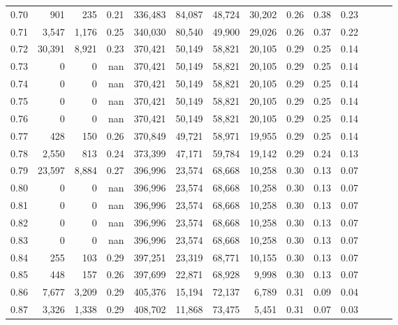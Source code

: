 \begin{tabular}{rrrrrrrrrrrrrr}
0.70 &     901 &    235 &  0.21 &  336,483 &   84,087 &  48,724 &  30,202 &  0.26 &  0.38 &      0.23 \\
0.71 &   3,547 &  1,176 &  0.25 &  340,030 &   80,540 &  49,900 &  29,026 &  0.26 &  0.37 &      0.22 \\
0.72 &  30,391 &  8,921 &  0.23 &  370,421 &   50,149 &  58,821 &  20,105 &  0.29 &  0.25 &      0.14 \\
0.73 &       0 &      0 &   nan &  370,421 &   50,149 &  58,821 &  20,105 &  0.29 &  0.25 &      0.14 \\
0.74 &       0 &      0 &   nan &  370,421 &   50,149 &  58,821 &  20,105 &  0.29 &  0.25 &      0.14 \\
0.75 &       0 &      0 &   nan &  370,421 &   50,149 &  58,821 &  20,105 &  0.29 &  0.25 &      0.14 \\
0.76 &       0 &      0 &   nan &  370,421 &   50,149 &  58,821 &  20,105 &  0.29 &  0.25 &      0.14 \\
0.77 &     428 &    150 &  0.26 &  370,849 &   49,721 &  58,971 &  19,955 &  0.29 &  0.25 &      0.14 \\
0.78 &   2,550 &    813 &  0.24 &  373,399 &   47,171 &  59,784 &  19,142 &  0.29 &  0.24 &      0.13 \\
0.79 &  23,597 &  8,884 &  0.27 &  396,996 &   23,574 &  68,668 &  10,258 &  0.30 &  0.13 &      0.07 \\
0.80 &       0 &      0 &   nan &  396,996 &   23,574 &  68,668 &  10,258 &  0.30 &  0.13 &      0.07 \\
0.81 &       0 &      0 &   nan &  396,996 &   23,574 &  68,668 &  10,258 &  0.30 &  0.13 &      0.07 \\
0.82 &       0 &      0 &   nan &  396,996 &   23,574 &  68,668 &  10,258 &  0.30 &  0.13 &      0.07 \\
0.83 &       0 &      0 &   nan &  396,996 &   23,574 &  68,668 &  10,258 &  0.30 &  0.13 &      0.07 \\
0.84 &     255 &    103 &  0.29 &  397,251 &   23,319 &  68,771 &  10,155 &  0.30 &  0.13 &      0.07 \\
0.85 &     448 &    157 &  0.26 &  397,699 &   22,871 &  68,928 &   9,998 &  0.30 &  0.13 &      0.07 \\
0.86 &   7,677 &  3,209 &  0.29 &  405,376 &   15,194 &  72,137 &   6,789 &  0.31 &  0.09 &      0.04 \\
0.87 &   3,326 &  1,338 &  0.29 &  408,702 &   11,868 &  73,475 &   5,451 &  0.31 &  0.07 &      0.03 \\

\end{tabular}
